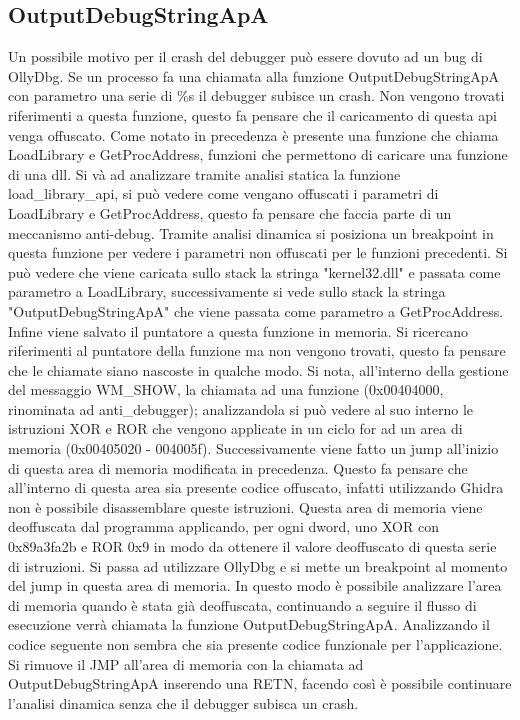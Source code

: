 \documentclass[a4paper,12pt]{article}
\begin{document}
\subsection{OutputDebugStringApA}
Un possibile motivo per il crash del debugger può essere dovuto ad un bug di OllyDbg. Se un processo fa una chiamata alla funzione OutputDebugStringApA con parametro una serie di \%s il debugger subisce un crash. Non vengono trovati riferimenti a questa funzione, questo fa pensare che il caricamento di questa api venga offuscato. Come notato in precedenza è presente una funzione che chiama LoadLibrary e GetProcAddress, funzioni che permettono di caricare una funzione di una dll. Si và ad analizzare tramite analisi statica la funzione load\_library\_api, si può vedere come vengano offuscati i parametri di LoadLibrary e GetProcAddress, questo fa pensare che faccia parte di un meccanismo anti-debug. Tramite analisi dinamica si posiziona un breakpoint in questa funzione per vedere i parametri non offuscati per le funzioni precedenti. Si può vedere che viene caricata sullo stack la stringa "kernel32.dll" e passata come parametro a LoadLibrary, successivamente si vede sullo stack la stringa "OutputDebugStringApA" che viene passata come parametro a GetProcAddress. Infine viene salvato il puntatore a questa funzione in memoria. 
Si ricercano riferimenti al puntatore della funzione ma non vengono trovati, questo fa pensare che le chiamate siano nascoste in qualche modo.  Si nota, all'interno della gestione del messaggio WM\_SHOW, la chiamata ad una funzione (0x00404000, rinominata ad anti\_debugger); analizzandola si può vedere al suo interno le istruzioni XOR e ROR che vengono applicate in un ciclo for ad un area di memoria (0x00405020 - 004005f).
 Successivamente viene fatto un jump all'inizio di questa area di memoria modificata in precedenza. Questo fa pensare che all'interno di questa area sia presente codice offuscato, infatti utilizzando Ghidra non è possibile disassemblare queste istruzioni.  Questa area di memoria viene deoffuscata dal programma applicando, per ogni dword, uno XOR con 0x89a3fa2b e ROR 0x9 in modo da ottenere il valore deoffuscato di questa serie di istruzioni.
 Si passa ad utilizzare OllyDbg e si mette un breakpoint al momento del jump in questa area di memoria. In questo modo è possibile analizzare l'area di memoria quando è stata già deoffuscata, continuando a seguire il flusso di esecuzione verrà chiamata la funzione OutputDebugStringApA. Analizzando il codice seguente non sembra che sia presente codice funzionale per l'applicazione. Si rimuove il JMP all'area di memoria con la chiamata ad OutputDebugStringApA inserendo una RETN, facendo così è possibile continuare l'analisi dinamica senza che il debugger subisca un crash.
\end{document}
